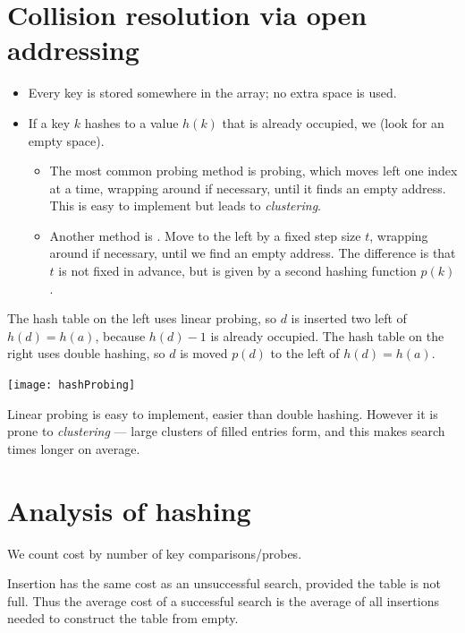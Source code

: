 \section*{Collision resolution via open addressing}
\begin{itemize}
\item Every key is stored somewhere in the array; no extra space is used.
\item If a key  $k$ hashes to a value $h(k)$ that is already occupied, 
we  (look for an empty space). 
	\begin{itemize}
		\item The most common probing method is  probing, which moves left
		 one index at a time, wrapping around if necessary, until it finds an empty 
		 address. This is easy to implement but leads to \emph{clustering}.
		\item Another method is . Move to the left by a
		fixed step size $t$, wrapping around if necessary, until we find an
		empty address. The difference is that $t$ is not fixed in advance, but
		is given by a second hashing function $p(k)$.
	\end{itemize}
\end{itemize}

\begin{Boxample}
The hash table on the left uses linear probing, so $d$ is inserted two left of $h(d) = h(a)$, because $h(d)-1$ is already occupied.
The hash table on the right uses double hashing, so $d$ is moved $p(d)$ to the left of $h(d) = h(a)$. 
\begin{center}
\texttt{[image: hashProbing]} 
\end{center}
\end{Boxample}

Linear probing is easy to implement, easier than double hashing.
However it is prone to \emph{clustering} --- large clusters of filled entries form, and this makes search times longer on average.



\section*{Analysis of hashing}

We count cost by number of key comparisons/probes.

Insertion has the same cost as an unsuccessful search, provided the table 
is not full. Thus the average cost of a successful search is the average of all insertions
 needed to construct the table from empty.


